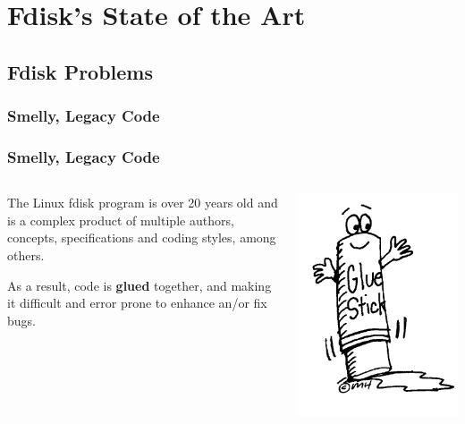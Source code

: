 \section{Fdisk's State of the Art}
\subsection{Fdisk Problems}
\subsubsection{Smelly, Legacy Code}

\begin{frame}\frametitle{Smelly, Legacy Code}
  \begin{columns}
    \begin{column}{.5\linewidth}
      The Linux fdisk program is over 20 years old and is a complex product of multiple authors, concepts, specifications and coding styles, among others.\newline

      As a result, code is \textbf{glued} together, and making it difficult and error prone to enhance an/or fix bugs.
    \end{column}
    \begin{column}{.5\linewidth}
      \includegraphics[scale=0.2]{img/glustick}
    \end{column}
  \end{columns}
\end{frame}

